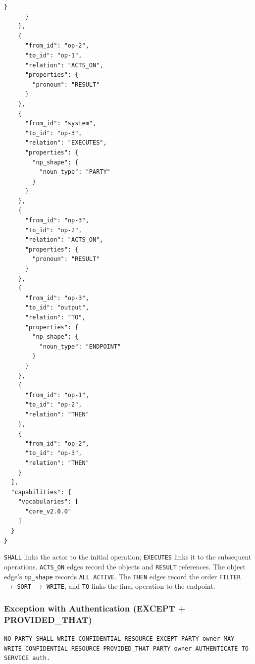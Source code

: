 \documentclass{article}
\begin{document}
\begin{lstlisting}[style=json]
        }
      }
    },
    {
      "from_id": "op-2",
      "to_id": "op-1",
      "relation": "ACTS_ON",
      "properties": {
        "pronoun": "RESULT"
      }
    },
    {
      "from_id": "system",
      "to_id": "op-3",
      "relation": "EXECUTES",
      "properties": {
        "np_shape": {
          "noun_type": "PARTY"
        }
      }
    },
    {
      "from_id": "op-3",
      "to_id": "op-2",
      "relation": "ACTS_ON",
      "properties": {
        "pronoun": "RESULT"
      }
    },
    {
      "from_id": "op-3",
      "to_id": "output",
      "relation": "TO",
      "properties": {
        "np_shape": {
          "noun_type": "ENDPOINT"
        }
      }
    },
    {
      "from_id": "op-1",
      "to_id": "op-2",
      "relation": "THEN"
    },
    {
      "from_id": "op-2",
      "to_id": "op-3",
      "relation": "THEN"
    }
  ],
  "capabilities": {
    "vocabularies": [
      "core_v2.0.0"
    ]
  }
}
\end{lstlisting}

\texttt{SHALL} links the actor to the initial operation; \texttt{EXECUTES} links it to the subsequent operations. \texttt{ACTS\_ON} edges record the objects and \texttt{RESULT} references. The object edge's \texttt{np\_shape} records \texttt{ALL ACTIVE}. The \texttt{THEN} edges record the order \texttt{FILTER} $\to$ \texttt{SORT} $\to$ \texttt{WRITE}, and \texttt{TO} links the final operation to the endpoint.

\subsubsection*{Exception with Authentication (EXCEPT + PROVIDED\_THAT)}

\texttt{NO PARTY SHALL WRITE CONFIDENTIAL RESOURCE EXCEPT PARTY owner MAY WRITE CONFIDENTIAL RESOURCE PROVIDED\_THAT PARTY owner AUTHENTICATE TO SERVICE auth.}
\end{document}
